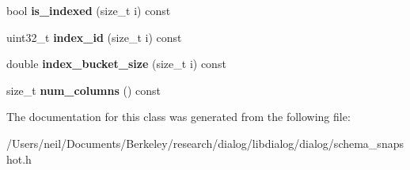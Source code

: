 \begin{DoxyCompactItemize}
\mbox{\label{classdialog_1_1schema__snapshot_aaeff59a5a08c61b8fd8f01f309b8629e}} 
bool {\bfseries is\+\_\+indexed} (size\+\_\+t i) const
\item 
\mbox{\label{classdialog_1_1schema__snapshot_aa705d25713db4786c6b8de73e37083c0}} 
uint32\+\_\+t {\bfseries index\+\_\+id} (size\+\_\+t i) const
\item 
\mbox{\label{classdialog_1_1schema__snapshot_a135bbfb07cbfaaa1fe5871e324edc508}} 
double {\bfseries index\+\_\+bucket\+\_\+size} (size\+\_\+t i) const
\item 
\mbox{\label{classdialog_1_1schema__snapshot_a8b8b70a74905df00da2412da1f74fcdb}} 
size\+\_\+t {\bfseries num\+\_\+columns} () const
\end{DoxyCompactItemize}


The documentation for this class was generated from the following file\+:\begin{DoxyCompactItemize}
\item 
/\+Users/neil/\+Documents/\+Berkeley/research/dialog/libdialog/dialog/schema\+\_\+snapshot.\+h\end{DoxyCompactItemize}

